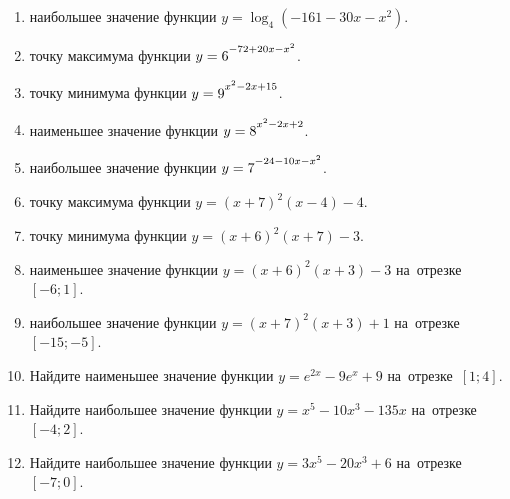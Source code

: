 \documentclass[a4paper,10pt]{article}
\begin{document}
\begin{enumerate}
\item {} наибольшее значение функции $y=\log_4\left(-161-30x-x^2\right)$.

\item {} точку максимума функции $y=6\strut^{-72+20x-x^2}$.

\item {} точку минимума функции $y=9\strut^{x^2-2x+15}$.

\item {} наименьшее значение функции $y=8\strut^{x^2-2x+2}$.

\item {} наибольшее значение функции $y=7\strut^{-24-10x-x^2}$.

\item {} точку максимума функции $y=\left(x+7\right)^2\left(x-4\right)-4$.

\item {} точку минимума функции $y=\left(x+6\right)^2\left(x+7\right)-3$.

\item {} наименьшее значение функции $y=\left(x+6\right)^2\left(x+3\right)-3$ на~отрезке~$\left[-6;1\right]$.

\item {} наибольшее значение функции $y=\left(x+7\right)^2\left(x+3\right)+1$ на~отрезке~$\left[-15;-5\right]$.

\item Найдите наименьшее значение функции $y=e^{2x}-9e^x+9$ на~отрезке~$\left[1;4\right]$.

\item Найдите наибольшее значение функции $y=x^5-10x^3-135x$ на~отрезке~$\left[-4;2\right]$.

\item Найдите наибольшее значение функции $y=3x^5-20x^3+6$ на~отрезке~$\left[-7;0\right]$.

\end{enumerate}
\end{document}
